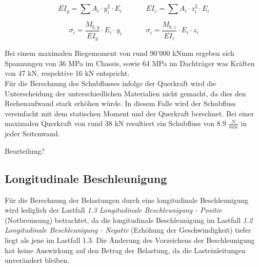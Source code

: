   \begin{equation}
    \label{eq:1}
      \overline{EI}_y = \sum A_i \cdot y_i^2 \cdot E_i \;\;\;\;\;\;\;\;\;\;\;\;  \overline{EI}_z = \sum A_i \cdot z_i^2 \cdot E_i
  \end{equation}

  \begin{equation}
    \label{eq:2}
      \sigma_i = \frac{M_{b,y}}{\overline{EI}_y}\cdot E_i \cdot y_i \;\;\;\;\;\;\;\;\;\;\;\; \sigma_i = \frac{M_{b,z}}{\overline{EI}_z}\cdot E_i \cdot z_i
  \end{equation}

  Bei einem maximalen Biegemoment von rund 90'000 kNmm ergeben sich Spannungen von 36 MPa im Chassis, sowie 64 MPa im Dachträger was Kräften von 47 kN, respektive 16 kN entspricht.\\
  Für die Berechnung des Schubflusses infolge der Querkraft wird die Unterscheidung der unterschiedlichen Materialien nicht gemacht, da dies den Rechenaufwand stark erhöhen würde. In diesem Falle wird der Schubfluss vereinfacht mit dem statischen Moment und der Querkraft berechnet. Bei einer maximalen Querkraft von rund 38 kN resultiert ein Schubfluss von 8.9 $\frac{N}{mm}$ in jeder Seitenwand.

  Beurteilung?


\subsection{Longitudinale Beschleunigung}
  \label{sub:Longitudinale Beschleunigung}
  Für die Berechnung der Belastungen durch eine longitudinale Beschleunigung wird lediglich der Lastfall \emph{1.3 Longitudinale Beschleunigung - Positiv} (Notbremsung) betrachtet, da die longitudinale Beschleunigung im Lastfall \emph{1.2 Longitudinale Beschleunigung - Negativ} (Erhöhung der Geschwindigkeit) tiefer liegt als jene im Lastfall 1.3. Die Änderung des Vorzeichens der Beschleunigung hat keine Auswirkung auf den Betrag der Belastung, da die Lasteinleitungen unverändert bleiben.

